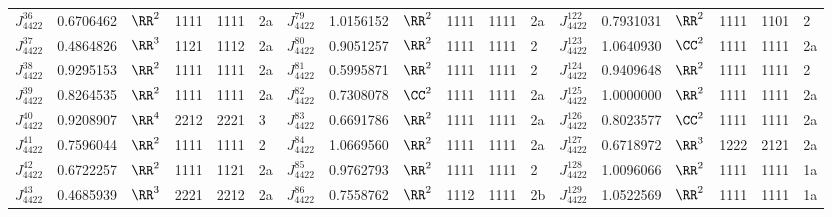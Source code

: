 \begin{table}[p]
\begin{tabular}{l l l l l l l l l l l l l l l l l l}
 $J^{36}_{4422}$&0.6706462&$\RR^2$&1111&1111&2a&\hphantom{v}$J^{79}_{4422}$&1.0156152&$\RR^2$&1111&1111&2a&\hphantom{v}$J^{122}_{4422}$&0.7931031&$\RR^2$&1111&1101&2\\
 $J^{37}_{4422}$&0.4864826&$\RR^3$&1121&1112&2a&\hphantom{v}$J^{80}_{4422}$&0.9051257&$\RR^2$&1111&1111&2&\hphantom{v}$J^{123}_{4422}$&1.0640930&$\CC^2$&1111&1111&2a\\
 $J^{38}_{4422}$&0.9295153&$\RR^2$&1111&1111&2a&\hphantom{v}$J^{81}_{4422}$&0.5995871&$\RR^2$&1111&1111&2&\hphantom{v}$J^{124}_{4422}$&0.9409648&$\RR^2$&1111&1111&2\\
 $J^{39}_{4422}$&0.8264535&$\RR^2$&1111&1111&2a&\hphantom{v}$J^{82}_{4422}$&0.7308078&$\CC^2$&1111&1111&2a&\hphantom{v}$J^{125}_{4422}$&1.0000000&$\RR^2$&1111&1111&2a\\
 $J^{40}_{4422}$&0.9208907&$\RR^4$&2212&2221&3&\hphantom{v}$J^{83}_{4422}$&0.6691786&$\RR^2$&1111&1111&2a&\hphantom{v}$J^{126}_{4422}$&0.8023577&$\CC^2$&1111&1111&2a\\
 $J^{41}_{4422}$&0.7596044&$\RR^2$&1111&1111&2&\hphantom{v}$J^{84}_{4422}$&1.0669560&$\RR^2$&1111&1111&2a&\hphantom{v}$J^{127}_{4422}$&0.6718972&$\RR^3$&1222&2121&2a\\
 $J^{42}_{4422}$&0.6722257&$\RR^2$&1111&1121&2a&\hphantom{v}$J^{85}_{4422}$&0.9762793&$\RR^2$&1111&1111&2&\hphantom{v}$J^{128}_{4422}$&1.0096066&$\RR^2$&1111&1111&1a\\
 $J^{43}_{4422}$&0.4685939&$\RR^3$&2221&2212&2a&\hphantom{v}$J^{86}_{4422}$&0.7558762&$\RR^2$&1112&1111&2b&\hphantom{v}$J^{129}_{4422}$&1.0522569&$\RR^2$&1111&1111&1a\\
 \hline
 \end{tabular}
 \label{table:vt}
 \end{table}

